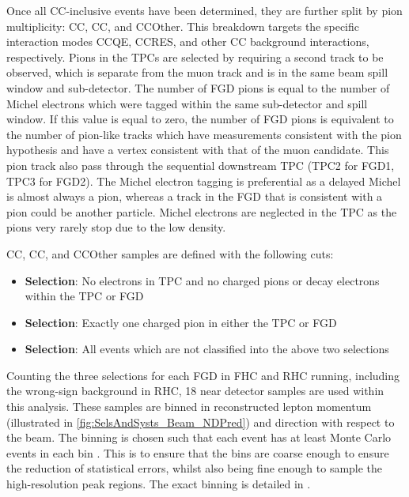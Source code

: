 Once all CC-inclusive events have been determined, they are further split by pion multiplicity: CC\quickmath{0\pi}, CC\quickmath{1\pi}, and CCOther. This breakdown targets the specific interaction modes CCQE, CCRES, and other CC background interactions, respectively. Pions in the TPCs are selected by requiring a second track to be observed, which is separate from the muon track and is in the same beam spill window and sub-detector. The number of FGD pions is equal to the number of Michel electrons which were tagged within the same sub-detector and spill window. If this value is equal to zero, the number of FGD pions is equivalent to the number of pion-like tracks which have  measurements consistent with the pion hypothesis and have a vertex consistent with that of the muon candidate. This pion track also pass through the sequential downstream TPC (TPC2 for FGD1, TPC3 for FGD2). The Michel electron tagging is preferential as a delayed Michel is almost always a pion, whereas a track in the FGD that is consistent with a pion could be another particle. Michel electrons are neglected in the TPC as the pions very rarely stop due to the low density.

CC\quickmath{0\pi}, CC\quickmath{1\pi}, and CCOther samples are defined with the following cuts:

\begin{itemize}
\item \textbf{ Selection}: No electrons in TPC and no charged pions or decay electrons within the TPC or FGD
\item \textbf{ Selection}: Exactly one charged pion in either the TPC or FGD
\item \textbf{ Selection}: All events which are not classified into the above two selections
\end{itemize}

Counting the three selections for each FGD in FHC and RHC running, including the wrong-sign background in RHC, 18 near detector samples are used within this analysis. These samples are binned in reconstructed lepton momentum (illustrated in \autoref{fig:SelsAndSysts_Beam_NDPred}) and direction with respect to the beam. The binning is chosen such that each event has at least  Monte Carlo events in each bin \cite{thesis_will}. This is to ensure that the bins are coarse enough to ensure the reduction of statistical errors, whilst also being fine enough to sample the high-resolution peak regions. The exact binning is detailed in \cite{thesis_will}.

